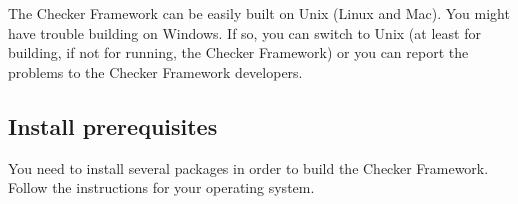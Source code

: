 
The Checker Framework can be easily built on Unix (Linux and Mac).  You
might have trouble building on Windows.  If so, you can switch to Unix (at
least for building, if not for running, the Checker Framework) or you can
report the problems to the Checker Framework developers.


\subsection{Install prerequisites\label{building-prerequisites}}

You need to install several packages in order to build the Checker
Framework.
Follow the instructions for your operating system.

